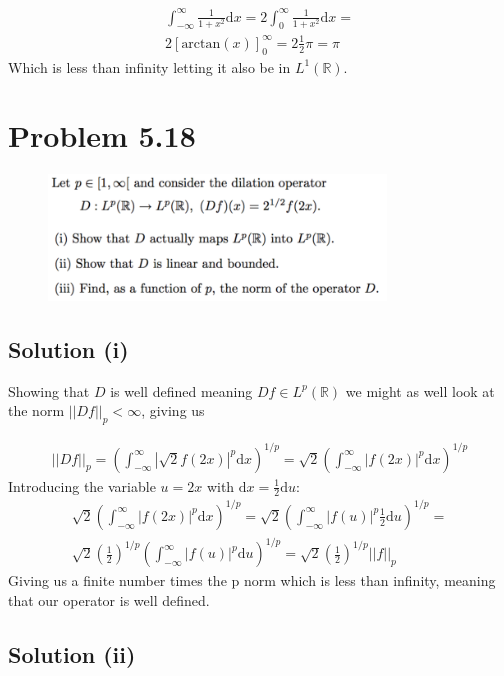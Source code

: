 \documentclass{article}
\begin{document}
\begin{gather*}
    \int_{-\infty}^{\infty} \frac{1}{1+x^2} \text{d}x=2  \int_{0}^{\infty} \frac{1}{1+x^2} \text{d}x = \\ 2 \left[ \text{arctan}(x) \right]_0^{\infty}=2 \frac{1}{2}\pi = \pi
\end{gather*}
Which is less than infinity letting it also be in $L^1(\mathbb{R})$. 

\section*{Problem 5.18}
\begin{figure}[H]
    \centering
    \includegraphics[width=0.8\textwidth]{fig/prob518}
\end{figure}

\subsection*{Solution (i)}

Showing that $D$ is well defined meaning $Df \in L^p(\mathbb{R})$ we might as well look at the norm $||Df||_p < \infty$, giving us

\begin{gather*}
    ||Df||_p = \left( \int_{-\infty}^{\infty}|\sqrt{2}f(2x)|^p \text{d}x\right)^{1/p}=\sqrt{2}\left( \int_{-\infty}^{\infty}|f(2x)|^p \text{d}x\right)^{1/p}
\end{gather*}
Introducing the variable $u=2x$ with $\text{d}x=\frac{1}{2} \text{d}u$:
\begin{gather*}
\sqrt{2}\left( \int_{-\infty}^{\infty}|f(2x)|^p \text{d}x\right)^{1/p}=\sqrt{2}\left( \int_{-\infty}^{\infty}|f(u)|^p \frac{1}{2}\text{d}u\right)^{1/p} = \\
\sqrt{2}\left(\frac{1}{2}\right)^{1/p}\left( \int_{-\infty}^{\infty}|f(u)|^p \text{d}u\right)^{1/p} =\sqrt{2}\left(\frac{1}{2}\right)^{1/p}||f||_p
\end{gather*}
Giving us a finite number times the p norm which is less than infinity, meaning that our operator is well defined.
\subsection*{Solution (ii)}
\end{document}

